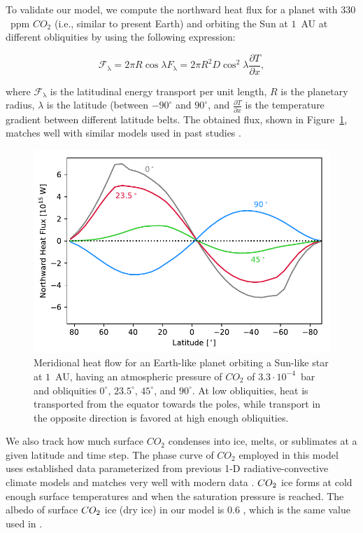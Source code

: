 \documentclass[fleqn,usenatbib]{mnras}
\providecommand{\DIFadd}[1]{{\bf #1}} %
\providecommand{\DIFdel}[1]{} %
\providecommand{\DIFaddbegin}{} %
\providecommand{\DIFaddend}{} %
\providecommand{\DIFdelbegin}{} %
\providecommand{\DIFdelend}{} %
\newcommand{\DIFscaledelfig}{0.5}
\newlength{\DIFdelgraphicswidth} %
\newlength{\DIFdelgraphicsheight} %
\newcommand{\DIFaddincludegraphics}[2][]{{\color{blue}\fbox{\DIFOincludegraphics[#1]{#2}}}} %
\newcommand{\DIFdelincludegraphics}[2][]{%
\sbox{\DIFdelgraphicsbox}{\DIFOincludegraphics[#1]{#2}}%
\settoboxwidth{\DIFdelgraphicswidth}{\DIFdelgraphicsbox} %
\settoboxtotalheight{\DIFdelgraphicsheight}{\DIFdelgraphicsbox} %
\scalebox{\DIFscaledelfig}{%
\parbox[b]{\DIFdelgraphicswidth}{\usebox{\DIFdelgraphicsbox}\\[-\baselineskip] \rule{\DIFdelgraphicswidth}{0em}}\llap{\resizebox{\DIFdelgraphicswidth}{\DIFdelgraphicsheight}{%
\setlength{\unitlength}{\DIFdelgraphicswidth}%
\begin{picture}(1,1)%
\thicklines\linethickness{2pt} %
{\color[rgb]{1,0,0}\put(0,0){\framebox(1,1){}}}%
{\color[rgb]{1,0,0}\put(0,0){\line( 1,1){1}}}%
{\color[rgb]{1,0,0}\put(0,1){\line(1,-1){1}}}%
\end{picture}%
}\hspace*{3pt}}} %
} %
\DeclareRobustCommand{\DIFaddbegin}{\DIFOaddbegin \let\includegraphics\DIFaddincludegraphics} %
\DeclareRobustCommand{\DIFaddend}{\DIFOaddend \let\includegraphics\DIFOincludegraphics} %
\DeclareRobustCommand{\DIFdelbegin}{\DIFOdelbegin \let\includegraphics\DIFdelincludegraphics} %
\DeclareRobustCommand{\DIFdelend}{\DIFOaddend \let\includegraphics\DIFOincludegraphics} %
\begin{document}
To validate our model, we compute the northward heat flux for a planet with $330$~ppm $CO_{\mathrm{2}}$ (i.e., similar to present Earth) and orbiting the Sun at $1$~AU at different obliquities by using the following expression:

\begin{equation}
    \mathcal{F}_{\mathrm{\lambda}}=2 \pi R \cos \lambda F_{\mathrm{\lambda}}=2 \pi R^{2} D \cos ^{2} \lambda \frac{\partial T}{\partial x},
\end{equation}

where $\mathcal{F}_{\mathrm{\lambda}}$ is the latitudinal energy transport per unit length, $R$ is the planetary radius, $\lambda$ is the latitude (between $-90^\circ$ and $90^\circ$, and $\frac{\partial T}{\partial x}$ is the temperature gradient between different latitude belts.
The obtained flux, shown in Figure~\ref{fig:flow}, matches well with similar models used in past studies \citep[e.g.,][]{WilliamsPollard}.

\begin{figure}
	\includegraphics[width=\columnwidth]{Figures/Meridional_flow.pdf}
    \caption{Meridional heat flow for an Earth-like planet  orbiting a Sun-like star at $1$~AU, having an atmospheric pressure of $CO_{\mathrm{2}}$ of $3.3\cdot10^{-4}$~bar and obliquities $0^\circ$, $23.5^\circ$, $45^\circ$, and $90^\circ$. At low obliquities, heat is transported from the equator towards the poles, while transport in the opposite direction is favored at high enough obliquities.}
    \label{fig:flow}
\end{figure}

We also track how much surface $CO_{\mathrm{2}}$  condenses into ice, melts, or sublimates at a given latitude and time step. The phase curve of $CO_{\mathrm{2}}$ employed in this model uses established data parameterized from previous 1-D radiative-convective climate models \citep{Kasting1991} and matches very well with modern data \citep{fray_sublimation_2009}. $CO_{\rm 2}$ ice forms at cold enough surface temperatures  and when the saturation pressure is reached.  The albedo of surface $CO_{\rm 2}$ ice (dry ice) in our model is 0.6 \DIFdelbegin \DIFdel{\citet{warren_spectral_1990}}\DIFdelend \DIFaddbegin \DIFadd{\citep{warren_spectral_1990}}\DIFaddend , which is the same value used in \citet{Turbet2017}.
\end{document}
